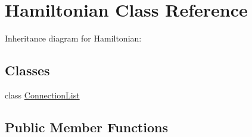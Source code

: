 \hypertarget{classHamiltonian}{}\section{Hamiltonian Class Reference}
\label{classHamiltonian}


Inheritance diagram for Hamiltonian\+:
\subsection*{Classes}
\begin{DoxyCompactItemize}
\item 
class \hyperlink{classHamiltonian_1_1ConnectionList}{Connection\+List}
\end{DoxyCompactItemize}
\subsection*{Public Member Functions}
